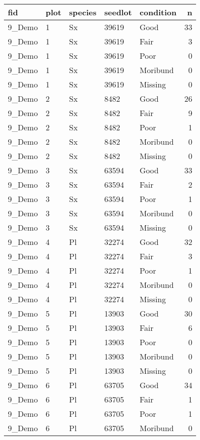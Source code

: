 \documentclass[
]{article}
\begin{document}
\begin{tabular}{l|l|l|l|l|r}
\hline
fid & plot & species & seedlot & condition & n\\
\hline
9\_Demo & 1 & Sx & 39619 & Good & 33\\
\hline
9\_Demo & 1 & Sx & 39619 & Fair & 3\\
\hline
9\_Demo & 1 & Sx & 39619 & Poor & 0\\
\hline
9\_Demo & 1 & Sx & 39619 & Moribund & 0\\
\hline
9\_Demo & 1 & Sx & 39619 & Missing & 0\\
\hline
9\_Demo & 2 & Sx & 8482 & Good & 26\\
\hline
9\_Demo & 2 & Sx & 8482 & Fair & 9\\
\hline
9\_Demo & 2 & Sx & 8482 & Poor & 1\\
\hline
9\_Demo & 2 & Sx & 8482 & Moribund & 0\\
\hline
9\_Demo & 2 & Sx & 8482 & Missing & 0\\
\hline
9\_Demo & 3 & Sx & 63594 & Good & 33\\
\hline
9\_Demo & 3 & Sx & 63594 & Fair & 2\\
\hline
9\_Demo & 3 & Sx & 63594 & Poor & 1\\
\hline
9\_Demo & 3 & Sx & 63594 & Moribund & 0\\
\hline
9\_Demo & 3 & Sx & 63594 & Missing & 0\\
\hline
9\_Demo & 4 & Pl & 32274 & Good & 32\\
\hline
9\_Demo & 4 & Pl & 32274 & Fair & 3\\
\hline
9\_Demo & 4 & Pl & 32274 & Poor & 1\\
\hline
9\_Demo & 4 & Pl & 32274 & Moribund & 0\\
\hline
9\_Demo & 4 & Pl & 32274 & Missing & 0\\
\hline
9\_Demo & 5 & Pl & 13903 & Good & 30\\
\hline
9\_Demo & 5 & Pl & 13903 & Fair & 6\\
\hline
9\_Demo & 5 & Pl & 13903 & Poor & 0\\
\hline
9\_Demo & 5 & Pl & 13903 & Moribund & 0\\
\hline
9\_Demo & 5 & Pl & 13903 & Missing & 0\\
\hline
9\_Demo & 6 & Pl & 63705 & Good & 34\\
\hline
9\_Demo & 6 & Pl & 63705 & Fair & 1\\
\hline
9\_Demo & 6 & Pl & 63705 & Poor & 1\\
\hline
9\_Demo & 6 & Pl & 63705 & Moribund & 0\\

\end{tabular}
\end{document}
